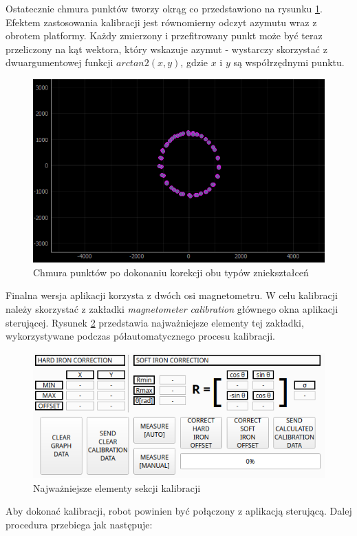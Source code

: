 Ostatecznie chmura punktów tworzy okrąg co przedstawiono na rysunku \ref{fig:2d-mag-soft-corr-applied}. Efektem zastosowania kalibracji jest równomierny odczyt azymutu wraz z obrotem platformy. Każdy zmierzony i przefitrowany punkt może być teraz przeliczony na kąt wektora, który wskazuje azymut - wystarczy skorzystać z dwuargumentowej funkcji $arctan2(x,y)$, gdzie $x$ i $y$ są współrzędnymi punktu.

\begin{figure}[ht]
	\centering
		\includegraphics[width=0.6\linewidth]{rys/ScanBot-11-2d-set-theta-then-sigma-and-done.PNG}
	\caption{Chmura punktów po dokonaniu korekcji obu typów zniekształceń}
	\label{fig:2d-mag-soft-corr-applied}
\end{figure}

Finalna wersja aplikacji korzysta z dwóch osi magnetometru. W celu kalibracji należy skorzystać z zakładki \emph{magnetometer calibration} głównego okna aplikacji sterującej. Rysunek \ref{fig:main-app-mag-section-bottom} przedstawia najważniejsze elementy tej zakładki, wykorzystywane podczas półautomatycznego procesu kalibracji.

\begin{figure}[ht]
	\centering
		\includegraphics[width=1\linewidth]{rys/main-app-view-magnetom-bottom.png}
	\caption{Najważniejsze elementy sekcji kalibracji}
	\label{fig:main-app-mag-section-bottom}
\end{figure}

Aby dokonać kalibracji, robot powinien być połączony z aplikacją sterującą. Dalej procedura przebiega jak następuje:

